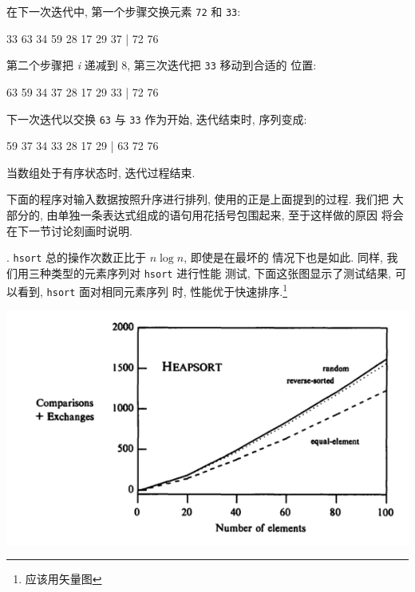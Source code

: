 在下一次迭代中, 第一个步骤交换元素 \texttt{72} 和 \texttt{33}:
\begin{file}
    33 63 34 59 28 17 29 37 | 72 76
\end{file}
第二个步骤把 \textit{i} 递减到 8, 第三次迭代把 \texttt{33} 移动到合适的 
位置:
\begin{file}
    63 59 34 37 28 17 29 33 | 72 76
\end{file}
下一次迭代以交换 \verb'63' 与 \verb'33' 作为开始, 迭代结束时, 序列变成:
\begin{file}
    59 37 34 33 28 17 29 | 63 72 76
\end{file}
当数组处于有序状态时, 迭代过程结束.

下面的程序对输入数据按照升序进行排列, 使用的正是上面提到的过程. 我们把 
大部分的, 由单独一条表达式组成的语句用花括号包围起来, 至于这样做的原因
将会在下一节讨论刻画时说明.

. \verb'hsort' 总的操作次数正比于 $n\log n$, 即使是在最坏的
情况下也是如此. 同样, 我们用三种类型的元素序列对 \verb'hsort' 进行性能
测试, 下面这张图显示了测试结果, 可以看到, \verb'hsort' 面对相同元素序列
时, 性能优于快速排序.\footnote{应该用矢量图}
\begin{center}
    \includegraphics[scale=0.7]{images/heap_sort.png}
\end{center}

